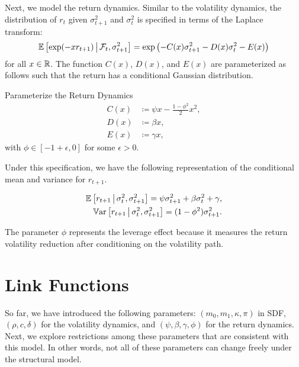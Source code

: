\documentclass[11pt, letterpaper, twoside]{article}
\begin{document}
Next, we model the return dynamics. Similar to the volatility dynamics, the distribution of $r_t$ given $\sigma^2_{t+1}$ and $\sigma^2_{t}$ is specified in terms of the Laplace transform:
%
\begin{equation}
    \label{eqn:return_laplace_transform}
    \operatorname{\mathbb{E}}\left[\exp(- x r_{t+1}) \,\middle\vert\, \mathcal{F}_{t}, \sigma^2_{t+1} \right] = \exp\left(- C(x) \sigma^2_{t+1} - D(x) \sigma^2_t - E(x)\right)
\end{equation}
%
for all $x \in \mathbb{R}$. The function $C(x)$, $D(x)$, and $E(x)$ are parameterized as follows such that the return has a conditional Gaussian distribution.

\begin{defn}{Parameterize the Return Dynamics}
    \label{defn:physical_return_dynamics}
    \begin{align}
        C(x) &\coloneqq \psi x - \frac{1 - \phi^2}{2} x^2,\\
        D(x) &\coloneqq \beta x, \\
        E(x) &\coloneqq \gamma x,
    \end{align}
with $\phi \in [-1+\epsilon, 0]$ for some $\epsilon>0$.
\end{defn}

Under this specification, we have the following representation of the conditional mean and variance for $r_{t+1}$.

\begin{remark} 
	\label{remark:return_moment_conditions}
	\begin{align}
		\label{eqn:rtn_cond_mean}
		\operatorname{\mathbb{E}}\left[r_{t+1} \,\middle\vert\, \sigma^2_t, \sigma^2_{t+1}\right] = \psi \sigma^2_{t+1} + \beta \sigma^2_t + \gamma, \\
		\label{eqn:rtn_cond_vol}
		\operatorname{\mathbb{V}ar}\left[r_{t+1} \,\middle\vert\, \sigma^2_t, \sigma^2_{t+1}\right] = (1 - \phi^2) \sigma^2_{t+1}.
	\end{align}
\end{remark}


The parameter $\phi$ represents the leverage effect because it measures the return volatility reduction after conditioning on the volatility path. 

\section{Link Functions}\label{sec:ilnk functions}

So far, we have introduced the following parameters: $(m_{0},m_{1},\kappa ,\pi )$ in SDF, $(\rho ,c,\delta)$ for the volatility dynamics, and $(\psi ,\beta ,\gamma ,\phi )$ for the return dynamics. Next, we explore restrictions among these parameters that are consistent with this model. In other words, not all of these parameters can change freely under the structural model.
\end{document}
